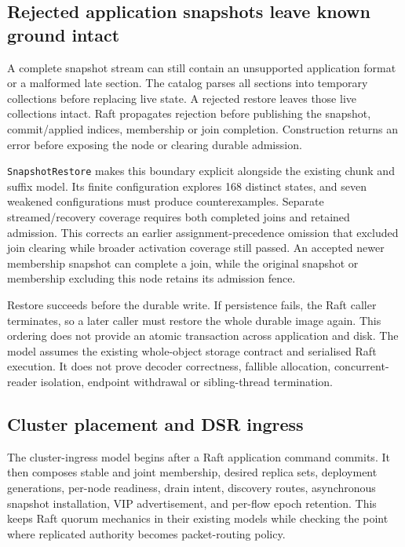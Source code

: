 \subsection{Rejected application snapshots leave known ground intact}

A complete snapshot stream can still contain an unsupported application format
or a malformed late section. The catalog parses all sections into temporary
collections before replacing live state. A rejected restore leaves those live
collections intact. Raft propagates rejection before publishing the snapshot,
commit/applied indices, membership or join completion. Construction returns an
error before exposing the node or clearing durable admission.

\texttt{SnapshotRestore} makes this boundary explicit alongside the
existing chunk and suffix model. Its finite configuration explores 168 distinct
states, and seven weakened configurations must produce counterexamples. Separate
streamed/recovery coverage requires both completed joins and retained admission.
This corrects an earlier assignment-precedence omission that excluded join
clearing while broader activation coverage still passed. An accepted
newer membership snapshot can complete a join, while the original snapshot or
membership excluding this node retains its admission fence.

Restore succeeds before the durable write. If persistence fails, the Raft caller
terminates, so a later caller must restore the whole durable image again. This
ordering does not provide an atomic transaction across application and disk.
The model assumes the existing whole-object storage contract and serialised
Raft execution. It does not prove decoder correctness, fallible allocation,
concurrent-reader isolation, endpoint withdrawal or sibling-thread termination.

\subsection{Cluster placement and DSR ingress}
\label{subsec:formal-cluster-ingress}

The cluster-ingress model begins after a Raft application command commits. It
then composes stable and joint membership, desired replica sets, deployment
generations, per-node readiness, drain intent, discovery routes, asynchronous
snapshot installation, VIP advertisement, and per-flow epoch retention. This
keeps Raft quorum mechanics in their existing models while checking the point
where replicated authority becomes packet-routing policy.

